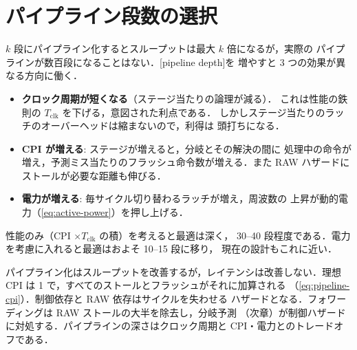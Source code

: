 \documentclass[../main.tex]{subfiles}
\begin{document}
\section{パイプライン段数の選択}

$k$ 段にパイプライン化するとスループットは最大 $k$ 倍になるが，実際の
パイプラインが数百段になることはない．[pipeline depth]を
増やすと 3 つの効果が異なる方向に働く．
\begin{itemize}
  \item \textbf{クロック周期が短くなる}（ステージ当たりの論理が減る）．
    これは性能の鉄則の $T_{\mathrm{clk}}$ を下げる，意図された利点である．
    しかしステージ当たりのラッチのオーバーヘッドは縮まないので，利得は
    頭打ちになる．
  \item \textbf{CPI が増える}: ステージが増えると，分岐とその解決の間に
    処理中の命令が増え，予測ミス当たりのフラッシュ命令数が増える．また
    RAW ハザードにストールが必要な距離も伸びる．
  \item \textbf{電力が増える}: 毎サイクル切り替わるラッチが増え，周波数の
    上昇が動的電力（\cref{eq:active-power}）を押し上げる．
\end{itemize}

性能のみ（CPI $\times T_{\mathrm{clk}}$ の積）を考えると最適は深く，
30--40 段程度である．電力を考慮に入れると最適はおよそ 10--15 段に移り，
現在の設計もこれに近い．

\begin{keypoint}[章のまとめ]
  パイプライン化はスループットを改善するが，レイテンシは改善しない．理想 CPI
  は 1 で，すべてのストールとフラッシュがそれに加算される
  （\cref{eq:pipeline-cpi}）．制御依存と RAW 依存はサイクルを失わせる
  ハザードとなる．フォワーディングは RAW ストールの大半を除去し，分岐予測
  （次章）が制御ハザードに対処する．パイプラインの深さはクロック周期と
  CPI・電力とのトレードオフである．
\end{keypoint}
\end{document}
